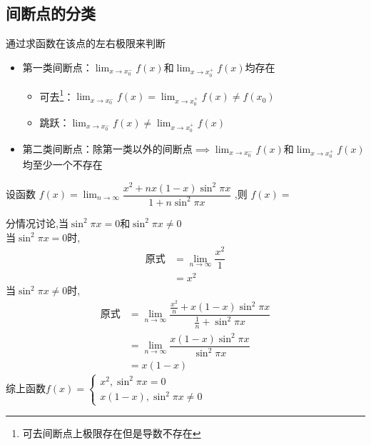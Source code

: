 \documentclass[8pt a4paper, oneside, UTF8]{ctexbook}
\begin{document}
\begin{sloppypar}
    \subsection{间断点的分类}
    通过求函数在该点的左右极限来判断
    \begin{itemize}
        \item 第一类间断点：$\lim _ { x \rightarrow x _ { 0 } ^{-}} f ( x )$​ 和$\lim _ { x \rightarrow x _ { 0 }^ {+}} f ( x )$​ 均存在
              \begin{itemize}
                  \item 可去\footnote{可去间断点上极限存在但是导数不存在}：$\lim _ { x \rightarrow x_0 ^ { - } } f ( x ) = \lim _ { x \rightarrow x_0^{+} } f  ( x ) \neq f(x_0)$
                  \item 跳跃：$\lim _ { x \rightarrow x_0^{-} } f ( x ) \not= \lim _ { x \rightarrow x_0^{+} } f ( x )$
              \end{itemize}
        \item 第二类间断点：除第一类以外的间断点$\implies \lim _ { x \rightarrow x _ { 0 } ^{-}} f ( x )$和$\lim _ { x \rightarrow x _ { 0 }^ {+}} f ( x )$​ 均至少一个不存在
    \end{itemize}
    \begin{problem}
         设函数 $f(x)=\lim_{n\to\infty}\dfrac{x^2+nx(1-x)\sin^2\pi x}{1+ n \sin^2 \pi x}$ ,则 $f(x)=$ 
    \end{problem}
    \begin{solution}
        分情况讨论,当$\sin^2 \pi x = 0$和$\sin^2 \pi x \neq 0$\\
        当$\sin^2 \pi x = 0$时,
        \begin{align*}
          \text{原式} & = \lim_{n\to \infty}\dfrac{x^2}{1} \\
          & =  x^2
        \end{align*}
        当$\sin^2 \pi x \neq 0$时,
        \begin{align*}
          \text{原式} & = \lim_{n\to \infty} \dfrac{\frac{x^2}{n}+x(1-x)\sin^2 \pi x}{\frac{1}{n}+\sin^2 \pi x} \\
          & = \lim_{n\to \infty} \dfrac{x(1-x)\sin^2 \pi x}{\sin^2 \pi x}\\
          & = x(1-x)
        \end{align*}
    综上函数$f(x)=\begin{cases}
        x^2 ,\sin^2 \pi x=0\\
        x(1-x),\sin^2 \pi x \neq 0
    \end{cases}$

\end{solution}
\end{sloppypar}
\end{document}
